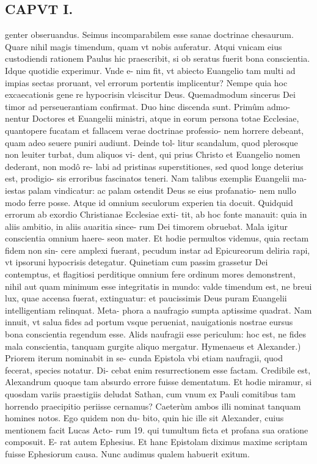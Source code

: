 \documentclass{article}
\begin{document}
\begin{pages}
\section*{CAPVT I. }
\marginpar{[ p.15 ]}\pstart genter obseruandus. Seimus incomparabilem esse sanae doctrinae chesaurum. Quare nihil magis timendum, quam vt nobis auferatur. Atqui vnicam eius custodiendi rationem Paulus hic praescribit, si ob seratus fuerit bona conscientia. Idque quotidie experimur. Vnde e- nim fit, vt abiecto Euangelio tam multi ad impias sectas proruant, vel errorum portentis implicentur? Nempe quia hoc excaecationis gene re hypocrisin vlciscitur Deus. Quemadmodum sincerus Dei timor ad perseuerantiam confirmat. Duo hinc discenda sunt. Primûm admo- nentur Doctores et Euangelii ministri, atque in eorum persona totae Ecclesiae, quantopere fucatam et fallacem verae doctrinae professio- nem horrere debeant, quam adeo seuere puniri audiunt. Deinde tol- litur scandalum, quod plerosque non leuiter turbat, dum aliquos vi- dent, qui prius Christo et Euangelio nomen dederant, non modô re- labi ad pristinas superstitiones, sed quod longe deterius est, prodigio- sis erroribus fascinatos teneri. Nam talibus exemplis Euangelii ma- iestas palam vindicatur: ac palam ostendit Deus se eius profanatio- nem nullo modo ferre posse. Atque id omnium seculorum experien tia docuit. Quidquid errorum ab exordio Christianae Ecclesiae exti- tit, ab hoc fonte manauit: quia in aliis ambitio, in aliis auaritia since- rum Dei timorem obruebat. Mala igitur conscientia omnium haere- seon mater. Et hodie permultos videmus, quia rectam fidem non sin- cere amplexi fuerant, pecudum instar ad Epicureorum deliria rapi, vt ipsoruni hypocrisis detegatur. Quinetiam cum passim grassetur Dei contemptus, et flagitiosi perditique omnium fere ordinum mores demonstrent, nihil aut quam minimum esse integritatis in mundo: valde timendum est, ne breui lux, quae accensa fuerat, extinguatur: et paucissimis Deus puram Euangelii intelligentiam relinquat. Meta- phora a naufragio sumpta aptissime quadrat. Nam innuit, vt salua fides ad portum vsque perueniat, nauigationis nostrae eursus bona conscientia regendum esse. Alids naufragii esse periculum: hoc est, ne fides mala conscientia, tanquam gurgite aliquo mergatur.  \pend\pstart Hymenaeus et Alexander.) Priorem iterum nominabit in se- cunda Epistola vbi etiam naufragii, quod fecerat, species notatur. Di- cebat enim resurrectionem esse factam. Credibile est, Alexandrum quoque tam absurdo errore fuisse dementatum. Et hodie miramur, si quosdam variis praestigiis deludat Sathan, cum vnum ex Pauli comitibus tam horrendo praecipitio periisse cernamus? Caeterùm ambos illi nominat tanquam homines notos. Ego quidem non du- bito, quin hic ille sit Alexander, cuius mentionem facit Lucas Acto- rum 19. qui tumultum ficta et profana sua oratione composuit. E- rat autem Ephesius. Et hanc Epistolam diximus maxime scriptam fuisse Ephesiorum causa. Nunc audimus qualem habuerit exitum.  \pend

\end{pages}
\end{document}
